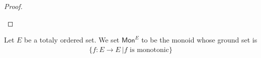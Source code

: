 \begin{proof}
\begin{enumerate}
\begin{figure}
    \caption{}\label{fig:transductionFlat}
    \end{figure}
\end{enumerate}
           \end{proof}
   Let $E$ be a totaly ordered set. We set $\mathsf{Mon}^E$ to be the monoid whose ground set is 
   \begin{align*}
   \{f:E\to E \ | f \text{ is monotonic}\}
\end{align*}    

